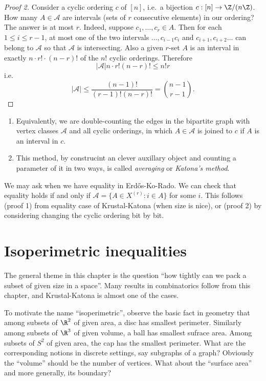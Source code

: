 \documentclass[a4paper]{article}
\begin{document}
\begin{proof}[Proof 2]
  Consider a cyclic ordering \(c\) of \([n]\), i.e.\ a bijection \(c: [n] \to \Z/(n\Z)\). How many \(A \in \mathcal A\) are intervals (sets of \(r\) consecutive elements) in our ordering? The answer is at most \(r\). Indeed, suppose \(c_1, \dots, c_r \in A\). Then for each \(1 \leq i \leq r - 1\), at most one of the two intervals \(\dots, c_{i - 1} c_i\) and \(c_{i + 1}, c_{i + 2} \dots\) can belong to \(\mathcal A\) so that \(\mathcal A\) is intersecting. Also a given \(r\)-set \(A\) is an interval in exactly \(n \cdot r! \cdot (n - r)!\) of the \(n!\) cyclic orderings. Therefore
  \[
    |\mathcal A| n \cdot r! (n - r)! \leq n! r
  \]
  i.e.
  \[
    |\mathcal A| \leq \frac{(n - 1)!}{(r - 1)! (n - r)!} = \binom{n - 1}{r - 1}.
  \]
\end{proof}

\begin{remark}\leavevmode
  \begin{enumerate}
  \item Equivalently, we are double-counting the edges in the bipartite graph with vertex classes \(\mathcal A\) and all cyclic orderings, in which \(A \in \mathcal A\) is joined to \(c\) if \(A\) is an interval in \(c\).
  \item This method, by construcint an clever auxillary object and counting a parameter of it in two ways, is called \emph{averaging} or \emph{Katona's method}.
  \end{enumerate}
\end{remark}

We may ask when we have equality in Erdős-Ko-Rado. We can check that equality holds if and only if \(\mathcal A = \{A \in X^{(r)}: i \in A\}\) for some \(i\). This follows (proof 1) from equality case of Krustal-Katona (when size is nice), or (proof 2) by considering changing the cyclic ordering bit by bit.

\section{Isoperimetric inequalities}

The general theme in this chapter is the question ``how tightly can we pack a subset of given size in a space''. Many results in combinatorics follow from this chapter, and Krustal-Katona is almost one of the cases.

To motivate the name ``isoperimetric'', observe the basic fact in geometry that among subsets of \(\R^2\) of given area, a disc has smallest perimeter. Similarly among subsets of \(\R^3\) of given volume, a ball has smallest sufrace area. Among subsets of \(S^2\) of given area, the cap has the smallest perimeter. What are the corresponding notions in discrete settings, say subgraphs of a graph? Obviously the ``volume'' should be the number of vertices. What about the ``surface area'' and more generally, its boundary?
\end{document}
